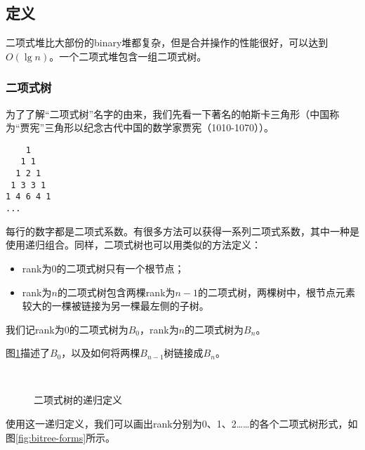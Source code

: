 \documentclass[UTF8]{article}
\begin{document}
\subsection{定义}

二项式堆比大部份的binary堆都复杂，但是合并操作的性能很好，可以达到$O(\lg n)$。一个二项式堆包含一组二项式树。

\subsubsection{二项式树}
\label{Binomial tree} 

为了了解“二项式树”名字的由来，我们先看一下著名的帕斯卡三角形（中国称为“贾宪”三角形以纪念古代中国的数学家贾宪（1010-1070））\cite{wiki-pascal-triangle}。

\begin{verbatim}
    1
   1 1
  1 2 1
 1 3 3 1
1 4 6 4 1
...
\end{verbatim}

每行的数字都是二项式系数。有很多方法可以获得一系列二项式系数，其中一种是使用递归组合。同样，二项式树也可以用类似的方法定义：

\begin{itemize}
\item rank为0的二项式树只有一个根节点；
\item rank为$n$的二项式树包含两棵rank为$n-1$的二项式树，两棵树中，根节点元素较大的一棵被链接为另一棵最左侧的子树。
\end{itemize}

我们记rank为0的二项式树为$B_0$，rank为$n$的二项式树为$B_n$。

图\ref{fig:link-bitree}描述了$B_0$，以及如何将两棵$B_{n-1}$树链接成$B_n$。

\begin{figure}[htbp]
  \centering
   \\
  \caption{二项式树的递归定义} \label{fig:link-bitree}
\end{figure}

使用这一递归定义，我们可以画出rank分别为0、1、2……的各个二项式树形式，如图\ref{fig:bitree-forms}所示。
\end{document}
